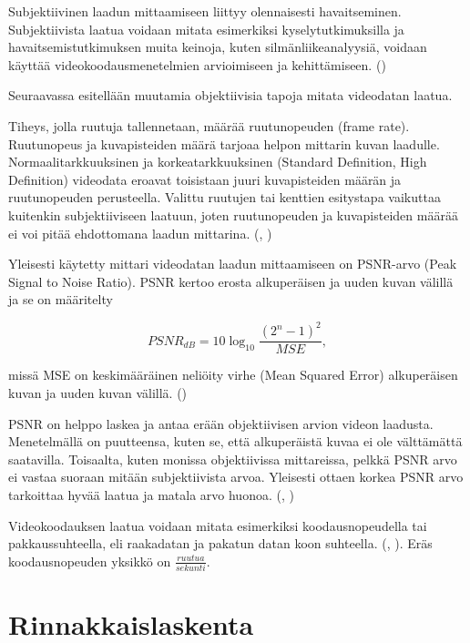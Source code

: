 Subjektiivinen laadun mittaamiseen liittyy olennaisesti havaitseminen.
Subjektiivista laatua voidaan mitata esimerkiksi kyselytutkimuksilla ja
havaitsemistutkimuksen muita keinoja, kuten silmänliikeanalyysiä, voidaan
käyttää videokoodausmenetelmien arvioimiseen ja kehittämiseen. (\citealt{perception})

Seuraavassa esitellään muutamia objektiivisia tapoja mitata videodatan laatua.

Tiheys, jolla ruutuja tallennetaan, määrää ruutunopeuden (frame rate).
Ruutunopeus ja kuvapisteiden määrä tarjoaa helpon mittarin kuvan laadulle.
Normaalitarkkuuksinen ja korkeatarkkuuksinen (Standard Definition, High
Definition) videodata eroavat toisistaan juuri kuvapisteiden määrän ja
ruutunopeuden perusteella. Valittu ruutujen tai kenttien esitystapa vaikuttaa
kuitenkin subjektiiviseen laatuun, joten ruutunopeuden ja kuvapisteiden määrää
ei voi pitää ehdottomana laadun mittarina. (\citealt{h264}, \citealt{du})

Yleisesti käytetty mittari videodatan laadun mittaamiseen on PSNR-arvo (Peak
Signal to Noise Ratio). PSNR kertoo erosta alkuperäisen ja uuden kuvan välillä
ja se on määritelty

\begin{center}
\begin{equation}PSNR_{dB} = 10\log_{10}\frac{(2^n - 1)^2}{MSE},\end{equation}
\end{center}

missä MSE on keskimääräinen neliöity virhe (Mean Squared Error) alkuperäisen 
kuvan ja uuden kuvan välillä. (\citealt{h264})

PSNR on helppo laskea ja antaa erään objektiivisen arvion videon laadusta.
Menetelmällä on puutteensa, kuten se, että alkuperäistä kuvaa ei ole
välttämättä saatavilla. Toisaalta, kuten monissa objektiivissa mittareissa,
pelkkä PSNR arvo ei vastaa suoraan mitään subjektiivista arvoa. Yleisesti
ottaen korkea PSNR arvo tarkoittaa hyvää laatua ja matala arvo huonoa.
(\citealt{h264}, \citealt{du})

Videokoodauksen laatua voidaan mitata esimerkiksi koodausnopeudella tai
pakkaussuhteella, eli raakadatan ja pakatun datan koon suhteella. (\citealt{li},
\citealt{xu}). Eräs koodausnopeuden yksikkö on
$\frac{ruutua}{sekunti}$.

\section{Rinnakkaislaskenta}
\label{chap:parallel}

